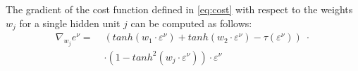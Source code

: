 The gradient of the cost function defined in \cref{eq:cost} with respect to the weights $w_j$ for a single hidden unit $j$ can be computed as follows:
\begin{equation}
    \label{eq:gradient-gen-weight}
    \begin{split}
        \nabla_{w_j} e^\nu =\; & (tanh(w_1 \cdot \varepsilon^\nu) + tanh(w_2 \cdot \varepsilon^\nu) - \tau(\varepsilon^\nu)) \; \cdot \\
        & \cdot (1 - tanh^2(w_j \cdot \varepsilon^\nu)) \cdot \varepsilon^\nu
    \end{split}
\end{equation}
